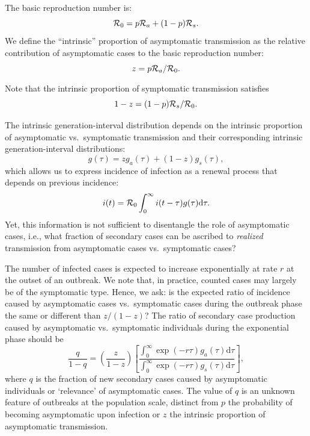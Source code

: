 The basic reproduction number \DIFdelbegin {}\DIFdelend \DIFaddbegin {}\DIFaddend is:
\begin{equation}
{\cal{R}}_{0}= p {\cal{R}}_a + (1-p) {\cal{R}}_s.
\end{equation}
We define the ``intrinsic'' proportion of asymptomatic transmission as the relative contribution of asymptomatic cases to the basic reproduction number:
\begin{equation}
z = p {\cal{R}}_a/{\cal{R}}_{0}\DIFaddbegin \DIFadd{.
}\DIFaddend \end{equation}
Note that the intrinsic proportion of symptomatic transmission satisfies
\begin{equation}
1-z = (1-p) {\cal{R}}_s/{\cal{R}}_{0}.
\end{equation}

The intrinsic generation-interval distribution depends on the intrinsic proportion of asymptomatic vs.~symptomatic transmission and their corresponding intrinsic generation-interval distributions:
\begin{equation}
g(\tau) = z g_a(\tau) + (1-z) g_s(\tau),
\end{equation}
which allows us to express incidence of infection as a renewal process that depends on previous incidence:
\begin{equation}
i(t) = {\cal{R}}_{0} \int_0^\infty i(t-\tau) g(\tau) \mathrm{d} \tau.
\end{equation}
Yet, this information is not sufficient to disentangle the role of asymptomatic cases, i.e., what fraction of secondary cases can be ascribed to \emph{realized} transmission from asymptomatic cases vs.~symptomatic cases?

The number of infected cases is expected to increase exponentially at rate $r$ at the outset of an outbreak. We note that, in practice, counted cases may largely be of the symptomatic type.
Hence, we ask: is the expected ratio of incidence caused by asymptomatic cases vs.~symptomatic cases during the outbreak phase the same or different than $z/(1-z)$?
The ratio of secondary case production caused by asymptomatic vs.~symptomatic individuals during the exponential phase should be
\begin{equation}
\frac{q}{1-q}=\left(\frac{z}{1-z}\right)\left[\frac{\int_0^\infty \exp(-r\tau) g_a(\tau) \mathrm{d}\tau}{\int_0^\infty \exp(-r\tau) g_s(\tau) \mathrm{d}\tau}\right],
\label{eq.qratio}
\end{equation}
where $q$ is the fraction of new secondary cases caused by asymptomatic individuals or `relevance' of asymptomatic cases. 
The value of $q$ is an unknown feature of outbreaks at the population scale, distinct from $p$ the probability of becoming asymptomatic upon infection or $z$ the intrinsic proportion of asymptomatic transmission.


